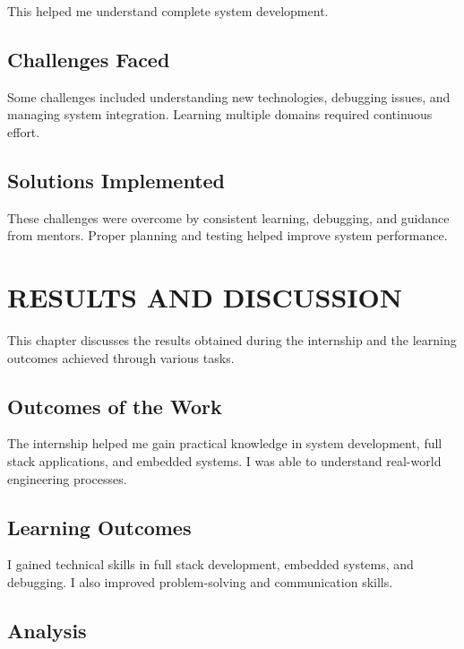 \documentclass[12pt,a4paper]{report}
\begin{document}
This helped me understand complete system development.




\section{Challenges Faced}

Some challenges included understanding new technologies, debugging issues, and managing system integration. Learning multiple domains required continuous effort.


\section{Solutions Implemented}

These challenges were overcome by consistent learning, debugging, and guidance from mentors. Proper planning and testing helped improve system performance.


\chapter{RESULTS AND DISCUSSION}


This chapter discusses the results obtained during the internship and the learning outcomes achieved through various tasks.




\section{Outcomes of the Work}

The internship helped me gain practical knowledge in system development, full stack applications, and embedded systems. I was able to understand real-world engineering processes.


\section{Learning Outcomes}

I gained technical skills in full stack development, embedded systems, and debugging. I also improved problem-solving and communication skills.


\section{Analysis}
\end{document}
